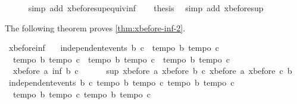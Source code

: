 \begin{isabellebody}
\ \ \ \ \isamarkupfalse%
\ {\isacharparenleft}simp\ add{\isacharcolon}\ xbefore{\isacharunderscore}sup{\isacharunderscore}equiv{\isacharunderscore}inf{\isacharparenright}\isanewline
\ \ \isamarkupfalse%
\ {\isacharquery}thesis\ \isamarkupfalse%
\ {\isacharparenleft}simp\ add{\isacharcolon}\ xbefore{\isacharunderscore}sup{\isacharunderscore}{}{\isacharparenright}\isanewline
{}\isamarkupfalse%
%
\endisatagproof
{\isafoldproof}%
%
\isadelimproof
%
\endisadelimproof
%
\begin{isamarkuptext}%
The following theorem proves \cref{thm:xbefore-inf-2}.%
\end{isamarkuptext}\isamarkuptrue%
\isamarkupfalse%
\ xbefore{\isacharunderscore}inf{\isacharunderscore}{}{\isacharcolon}\ \isanewline
\ \ {\isachardoublequoteopen}independent{\isacharunderscore}events\ b\ c\ {\isasymLongrightarrow}\ {\isasymlbrakk}tempo{}\ b{\isacharsemicolon}\ tempo{}\ c{\isasymrbrakk}\ {\isasymLongrightarrow}\ \isanewline
\ \ {\isasymlbrakk}tempo{}\ b{\isacharsemicolon}\ tempo{}\ c{\isasymrbrakk}\ {\isasymLongrightarrow}\ {\isasymlbrakk}tempo{}\ b{\isacharsemicolon}\ tempo{}\ c{\isasymrbrakk}\ {\isasymLongrightarrow}\ {\isasymlbrakk}tempo{}\ b{\isacharsemicolon}\ tempo{}\ c{\isasymrbrakk}\ {\isasymLongrightarrow}\ \isanewline
\ \ xbefore\ a\ {\isacharparenleft}inf\ b\ c{\isacharparenright}\ {\isacharequal}\ \isanewline
\ \ \ \ sup\ {\isacharparenleft}xbefore\ a\ {\isacharparenleft}xbefore\ b\ c{\isacharparenright}{\isacharparenright}\ {\isacharparenleft}xbefore\ a\ {\isacharparenleft}xbefore\ c\ b{\isacharparenright}{\isacharparenright}{\isachardoublequoteclose}\isanewline
%
\isadelimproof
%
\endisadelimproof
%
\isatagproof
{}\isamarkupfalse%
{\isacharminus}\isanewline
\ \ \isamarkupfalse%
\ {\isachardoublequoteopen}independent{\isacharunderscore}events\ b\ c{\isachardoublequoteclose}\ {\isachardoublequoteopen}tempo{}\ b{\isachardoublequoteclose}\ {\isachardoublequoteopen}tempo{}\ c{\isachardoublequoteclose}\ {\isachardoublequoteopen}tempo{}\ b{\isachardoublequoteclose}\ {\isachardoublequoteopen}tempo{}\ c{\isachardoublequoteclose}\ \isanewline
\ \ {\isachardoublequoteopen}tempo{}\ b{\isachardoublequoteclose}\ {\isachardoublequoteopen}tempo{}\ c{\isachardoublequoteclose}\ {\isachardoublequoteopen}tempo{}\ b{\isachardoublequoteclose}\ {\isachardoublequoteopen}tempo{}\ c{\isachardoublequoteclose}\isanewline

\end{isabellebody}
